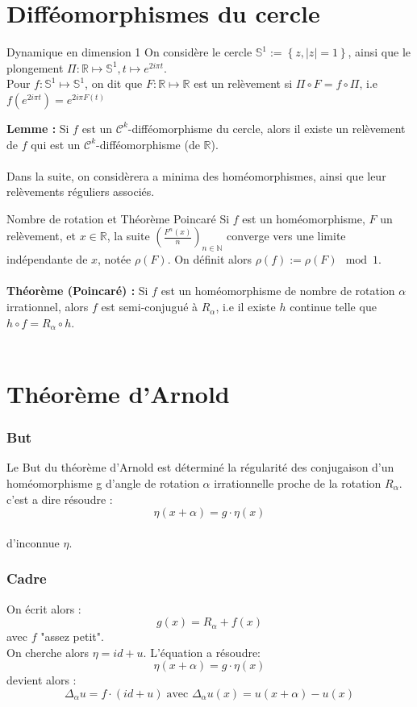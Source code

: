 \documentclass[10pt]{beamer}
\begin{document}
\section{Difféomorphismes du cercle}
\begin{frame}{Dynamique en dimension 1}
    On considère le cercle $\mathbb{S}^1 := \left\{z, |z|=1 \right\}$, ainsi que le plongement $\Pi : \mathbb{R} \mapsto \mathbb{S}^1, t \mapsto e^{2i\pi t}$. \\
    
Pour $f:\mathbb{S}^1 \mapsto \mathbb{S}^1$, on dit que $F: \mathbb{R} \mapsto \mathbb{R}$ est un relèvement si $\Pi \circ F = f \circ \Pi$, i.e $f(e^{2i\pi t}) = e^{2i\pi F(t)}$

\textbf{Lemme :} Si $f$ est un $\mathcal{C}^k$-difféomorphisme du cercle, alors il existe un relèvement de $f$ qui est un $\mathcal{C}^k$-difféomorphisme (de $\mathbb{R}$). \\~\\

Dans la suite, on considèrera a minima des homéomorphismes, ainsi que leur relèvements réguliers associés.
\end{frame}

\begin{frame}{Nombre de rotation et Théorème Poincaré }
    Si $f$ est un homéomorphisme, $F$ un relèvement, et $x\in \mathbb{R}$, la suite $\displaystyle (\frac{F^n(x)}{n})_{n\in \mathbb{N}}$ converge vers une limite indépendante de $x$, notée $\rho(F)$. On définit alors $\rho(f):= \rho(F) \mod 1$. \\~\\
   
\textbf{Théorème (Poincaré) :} Si $f$ est un homéomorphisme de nombre de rotation $\alpha$ irrationnel, alors $f$ est semi-conjugué à $R_\alpha$, i.e il existe $h$ continue telle que $h \circ f = R_\alpha \circ h$. \\~\\
\end{frame}

\section{Théorème d'Arnold}
\begin{frame}
\frametitle{But}
Le But du théorème d'Arnold est déterminé la régularité des conjugaison d'un homéomorphisme g d'angle de rotation $\alpha$ irrationnelle proche de la rotation $R_\alpha$. c'est a dire résoudre :
$$\eta(x + \alpha)= g \cdot \eta(x)$$
\\
d'inconnue $\eta$.
\end{frame}
\begin{frame}
\frametitle{Cadre}
On écrit alors :
\[ g(x) = R_\alpha + f(x) \]
avec $f$ "assez petit". \\
On cherche alors $\eta= id + u $. 
L'équation a résoudre:
$$\eta(x + \alpha)= g \cdot \eta(x)$$
devient alors : 
$$ \Delta_\alpha u= f \cdot (id +u)  \; \text{avec  } \Delta_\alpha u(x)= u(x+\alpha) - u(x)$$

\end{frame}
\end{document}
